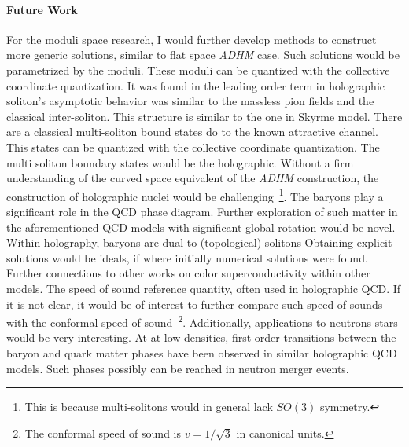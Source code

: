 \documentclass[12pt]{article}
\begin{document}
\paragraph{Future Work}

For the moduli space research, I would further develop methods to construct more generic solutions, similar to flat space \textit{ADHM} case.
%
Such solutions would be parametrized by the moduli.
%
These moduli can be quantized with the collective coordinate quantization.
%
It was found in the leading order term in holographic soliton's asymptotic behavior was similar to the massless pion fields and the classical inter-soliton.
%
This structure is similar to the one in Skyrme model.
% 
There are a classical multi-soliton bound states do to the known attractive channel.
%
This states can be quantized with the collective coordinate quantization.
%
The multi soliton boundary states would be the holographic.
%
Without a firm understanding of the curved space equivalent of the \textit{ADHM} construction, the construction of holographic nuclei would be challenging\
  \footnote{This is because multi-solitons would in general lack $SO(3)$ symmetry.}.
% 
The baryons play a significant role in the QCD phase diagram.
%
Further exploration of such matter in the aforementioned QCD models with significant global rotation would be novel.
% 
Within holography, baryons are dual to (topological) solitons
%
Obtaining explicit solutions would be ideals, if where initially numerical solutions were found.
% 
Further connections to other works on color superconductivity within other models.
% 
The speed of sound reference quantity, often used in holographic QCD.
%
If it is not clear, it would be of interest to further compare such speed of sounds with the conformal speed of sound\
  \footnote{The conformal speed of sound is $v = 1/\sqrt{3}$ in canonical units.}.
%
Additionally, applications to neutrons stars would be very interesting.
%
At at low densities, first order transitions between the baryon and quark matter phases have been observed in similar holographic QCD models.
%
Such phases possibly can be reached in neutron merger events.
\end{document}
